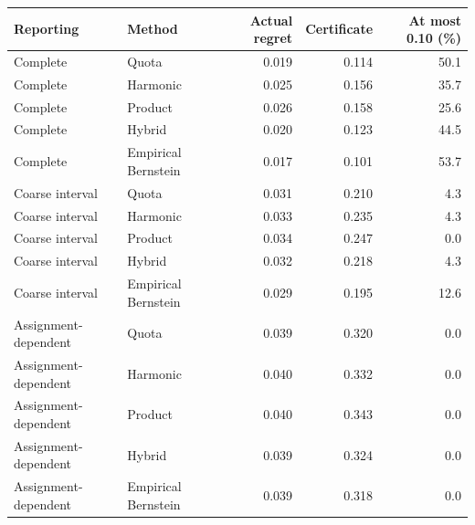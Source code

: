\begin{tabular}{llrrr}
\toprule
Reporting & Method & Actual regret & Certificate & At most 0.10 (\%)\\
\midrule
Complete & Quota & 0.019 & 0.114 & 50.1\\
Complete & Harmonic & 0.025 & 0.156 & 35.7\\
Complete & Product & 0.026 & 0.158 & 25.6\\
Complete & Hybrid & 0.020 & 0.123 & 44.5\\
Complete & Empirical Bernstein & 0.017 & 0.101 & 53.7\\
Coarse interval & Quota & 0.031 & 0.210 & 4.3\\
Coarse interval & Harmonic & 0.033 & 0.235 & 4.3\\
Coarse interval & Product & 0.034 & 0.247 & 0.0\\
Coarse interval & Hybrid & 0.032 & 0.218 & 4.3\\
Coarse interval & Empirical Bernstein & 0.029 & 0.195 & 12.6\\
Assignment-dependent & Quota & 0.039 & 0.320 & 0.0\\
Assignment-dependent & Harmonic & 0.040 & 0.332 & 0.0\\
Assignment-dependent & Product & 0.040 & 0.343 & 0.0\\
Assignment-dependent & Hybrid & 0.039 & 0.324 & 0.0\\
Assignment-dependent & Empirical Bernstein & 0.039 & 0.318 & 0.0\\
\bottomrule
\end{tabular}
